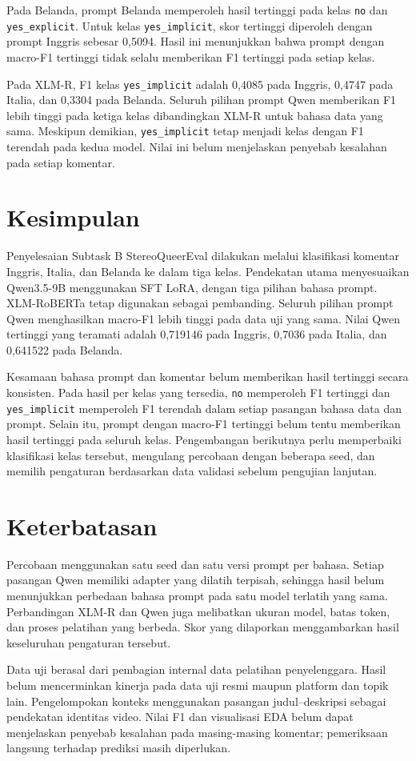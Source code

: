 \documentclass[11pt]{article}
\begin{document}
Pada Belanda, prompt Belanda memperoleh hasil tertinggi pada kelas \texttt{no} dan \texttt{yes\_explicit}. Untuk kelas \texttt{yes\_implicit}, skor tertinggi diperoleh dengan prompt Inggris sebesar 0,5094. Hasil ini menunjukkan bahwa prompt dengan macro-F1 tertinggi tidak selalu memberikan F1 tertinggi pada setiap kelas.

Pada XLM-R, F1 kelas \texttt{yes\_implicit} adalah 0,4085 pada Inggris, 0,4747 pada Italia, dan 0,3304 pada Belanda. Seluruh pilihan prompt Qwen memberikan F1 lebih tinggi pada ketiga kelas dibandingkan XLM-R untuk bahasa data yang sama. Meskipun demikian, \texttt{yes\_implicit} tetap menjadi kelas dengan F1 terendah pada kedua model. Nilai ini belum menjelaskan penyebab kesalahan pada setiap komentar.

\section{Kesimpulan}
Penyelesaian Subtask B StereoQueerEval dilakukan melalui klasifikasi komentar Inggris, Italia, dan Belanda ke dalam tiga kelas. Pendekatan utama menyesuaikan Qwen3.5-9B menggunakan SFT LoRA, dengan tiga pilihan bahasa prompt. XLM-RoBERTa tetap digunakan sebagai pembanding. Seluruh pilihan prompt Qwen menghasilkan macro-F1 lebih tinggi pada data uji yang sama. Nilai Qwen tertinggi yang teramati adalah 0,719146 pada Inggris, 0,7036 pada Italia, dan 0,641522 pada Belanda.

Kesamaan bahasa prompt dan komentar belum memberikan hasil tertinggi secara konsisten. Pada hasil per kelas yang tersedia, \texttt{no} memperoleh F1 tertinggi dan \texttt{yes\_implicit} memperoleh F1 terendah dalam setiap pasangan bahasa data dan prompt. Selain itu, prompt dengan macro-F1 tertinggi belum tentu memberikan hasil tertinggi pada seluruh kelas. Pengembangan berikutnya perlu memperbaiki klasifikasi kelas tersebut, mengulang percobaan dengan beberapa seed, dan memilih pengaturan berdasarkan data validasi sebelum pengujian lanjutan.

\section*{Keterbatasan}
Percobaan menggunakan satu seed dan satu versi prompt per bahasa. Setiap pasangan Qwen memiliki adapter yang dilatih terpisah, sehingga hasil belum menunjukkan perbedaan bahasa prompt pada satu model terlatih yang sama. Perbandingan XLM-R dan Qwen juga melibatkan ukuran model, batas token, dan proses pelatihan yang berbeda. Skor yang dilaporkan menggambarkan hasil keseluruhan pengaturan tersebut.

Data uji berasal dari pembagian internal data pelatihan penyelenggara. Hasil belum mencerminkan kinerja pada data uji resmi maupun platform dan topik lain. Pengelompokan konteks menggunakan pasangan judul--deskripsi sebagai pendekatan identitas video. Nilai F1 dan visualisasi EDA belum dapat menjelaskan penyebab kesalahan pada masing-masing komentar; pemeriksaan langsung terhadap prediksi masih diperlukan.


\end{document}
